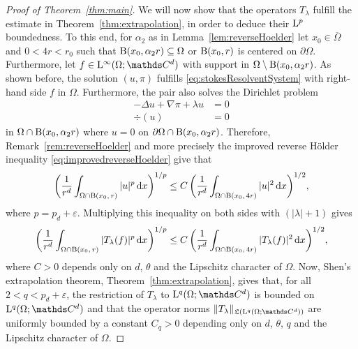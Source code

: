 \begin{proof}[Proof of Theorem~\ref{thm:main}]
  We will now show that the operators $T_\lambda$ fulfill the estimate in Theorem~\ref{thm:extrapolation}, in order to deduce their $\mathrm{L}^p$ boundedness.
  To this end, for $\alpha_2$ as in Lemma~\ref{lem:reverseHoelder} let $x_0 \in \overline \Omega$ and $0 < 4r < r_0$ such that $\mathrm{B}(x_0,\alpha_2 r) \subseteq \Omega$ or $\mathrm{B}(x_0, r)$ is centered on $\partial\Omega$.
  Furthermore, let $f \in \Ell^\infty(\Omega; \C^d)$ with support in $\Omega \setminus \mathrm{B}(x_0, \alpha_2 r)$.
  As shown before, the solution $(u,\pi)$ fulfills \eqref{eq:stokesResolventSystem} with right-hand side $f$ in $\Omega$.
  Furthermore, the pair also solves the Dirichlet problem
  \begin{align*}
    -\Delta u + \nabla \pi + \lambda u &= 0 \\
    \div(u)&= 0
  \end{align*}
  in $\Omega \cap \mathrm{B}(x_0, \alpha_2 r)$ where $u = 0$ on $\partial\Omega \cap \mathrm{B}(x_0, \alpha_2 r)$.
  Therefore, Remark~\ref{rem:reverseHoelder} and more precisely the improved reverse Hölder inequality \eqref{eq:improvedreverseHoelder} give that
  \begin{align*}
    \bigg( \frac{1}{r^d} \int_{\Omega \cap \mathrm{B}(x_0,\, r)} |u|^p \, {\operatorname{d}\!{x}} \bigg)^{1/p} 
    \leq C\, \bigg( \frac{1}{r^d} \int_{\Omega \cap  \mathrm{B}(x_0,\, 4 r)} |u|^2 \, {\operatorname{d}\!{x}} \bigg)^{1/2},
  \end{align*}
  where $p = p_d + \varepsilon$.
  Multiplying this inequality on both sides with $(|\lambda| + 1)$ gives
  \begin{align}
    \label{eq:tlambdaEstimate}
    \bigg( \frac{1}{r^d} \int_{\Omega \cap \mathrm{B}(x_0,\, r)} |T_\lambda(f)|^p \, {\operatorname{d}\!{x}} \bigg)^{1/p} 
    \leq C\, \bigg( \frac{1}{r^d} \int_{\Omega \cap \mathrm{B}(x_0,\, 4 r)} |T_\lambda(f)|^2 \, {\operatorname{d}\!{x}} \bigg)^{1/2},
  \end{align}
  where $C > 0$ depends only on $d$, $\theta$ and the Lipschitz character of $\Omega$.
  Now, Shen's extrapolation theorem, Theorem~\ref{thm:extrapolation}, gives that, for all $2 < q < p_d + \varepsilon$, the restriction of $T_\lambda$ to $\Ell^q(\Omega; \C^d)$ is bounded on $\Ell^q(\Omega; \C^d)$ and that the operator norms $\|T_\lambda\|_{\Li(\Ell^q(\Omega; \C^d))}$ are uniformly bounded by a constant $C_q > 0$ depending only on $d$, $\theta$, $q$ and the Lipschitz character of $\Omega$.


\end{proof}

